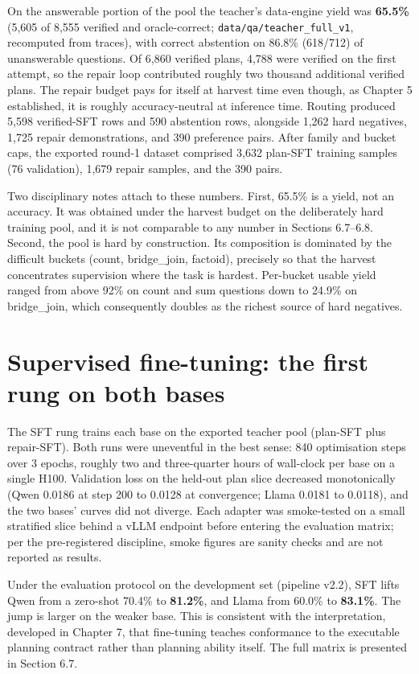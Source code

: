 \documentclass[10pt]{article} %
\begin{document}
On the answerable portion of the pool the teacher's data-engine yield was \textbf{65.5\%}
(5,605 of 8,555 verified and oracle-correct; \texttt{data/qa/teacher\_full\_v1}, recomputed from
traces), with correct abstention on 86.8\% (618/712) of unanswerable questions. Of 6,860
verified plans, 4,788 were verified on the first attempt, so the repair loop contributed
roughly two thousand additional verified plans. The repair budget pays for itself at harvest
time even though, as Chapter 5 established, it is roughly accuracy-neutral at inference time.
Routing produced 5,598 verified-SFT rows and 590 abstention rows, alongside 1,262 hard
negatives, 1,725 repair demonstrations, and 390 preference pairs. After family and bucket
caps, the exported round-1 dataset comprised 3,632 plan-SFT training samples (76 validation),
1,679 repair samples, and the 390 pairs.

Two disciplinary notes attach to these numbers. First, 65.5\% is a yield, not an accuracy. It
was obtained under the harvest budget on the deliberately hard training pool, and it is not
comparable to any number in Sections 6.7--6.8. Second, the pool is hard by construction. Its
composition is dominated by the difficult buckets (count, bridge\_join, factoid), precisely so
that the harvest concentrates supervision where the task is hardest. Per-bucket usable yield
ranged from above 92\% on count and sum questions down to 24.9\% on bridge\_join, which
consequently doubles as the richest source of hard negatives.

\section{Supervised fine-tuning: the first rung on both bases}\label{sec:supervised-fine-tuning-the-first-rung-on}

The SFT rung trains each base on the exported teacher pool (plan-SFT plus repair-SFT). Both
runs were uneventful in the best sense: 840 optimisation steps over 3 epochs, roughly two and
three-quarter hours of wall-clock per base on a single H100. Validation loss on the held-out
plan slice decreased monotonically (Qwen 0.0186 at step 200 to 0.0128 at convergence; Llama
0.0181 to 0.0118), and the two bases' curves did not diverge. Each adapter was smoke-tested on
a small stratified slice behind a vLLM endpoint before entering the evaluation matrix; per the
pre-registered discipline, smoke figures are sanity checks and are not reported as results.

Under the evaluation protocol on the development set (pipeline v2.2), SFT lifts Qwen from a
zero-shot 70.4\% to \textbf{81.2\%}, and Llama from 60.0\% to \textbf{83.1\%}. The jump is larger on the
weaker base. This is consistent with the interpretation, developed in Chapter 7, that
fine-tuning teaches conformance to the executable planning contract rather than planning
ability itself. The full matrix is presented in Section 6.7.
\end{document}

